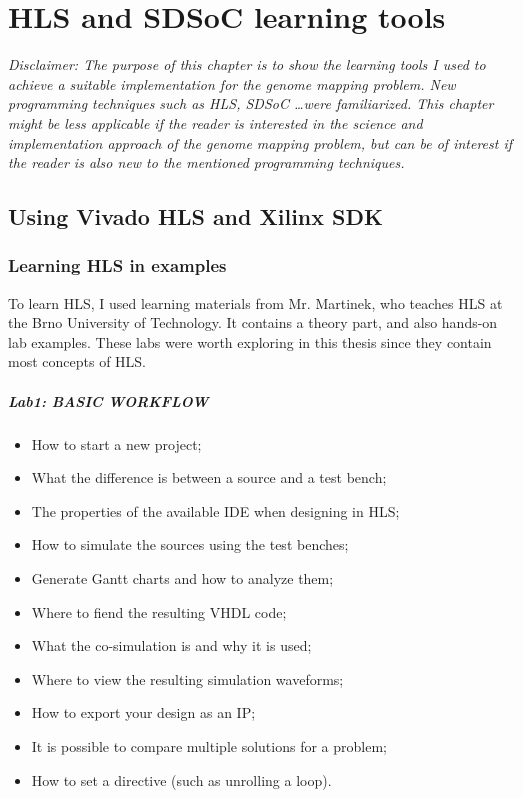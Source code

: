 
\chapter{HLS and SDSoC learning tools}
\label{ch:InitDiff}

\textit{Disclaimer: The purpose of this chapter is to show the learning tools I used to achieve a suitable implementation for the genome mapping problem. New programming techniques such as HLS, SDSoC \dots were familiarized. This chapter might be less applicable if the reader is interested in the science and implementation approach of the genome mapping problem, but can be of interest if the reader is also new to the mentioned programming techniques.}

\section{Using Vivado HLS and Xilinx SDK}

\subsection{Learning HLS in examples}
\label{HLS}

To learn HLS, I used learning materials from Mr. Martinek, who teaches HLS at the Brno University of Technology. It contains a theory part,  and also hands-on lab examples. These labs were worth exploring in this thesis since they contain most concepts of HLS.

\paragraph{Lab1: BASIC WORKFLOW} 
\begin{itemize}
	\item How to start a new project;
	\item What the difference is between a source and a test bench;
	\item The properties of the available IDE when designing in HLS;
	\item How to simulate the sources using the test benches;
	\item Generate Gantt charts and how to analyze them;
	\item Where to fiend the resulting VHDL code;
	\item What the co-simulation is and why it is used;
	\item Where to view the resulting simulation waveforms;
	\item How to export your design as an IP;
	\item It is possible to compare multiple solutions for a problem;
	\item How to set a directive (such as unrolling a loop).
\end{itemize}

